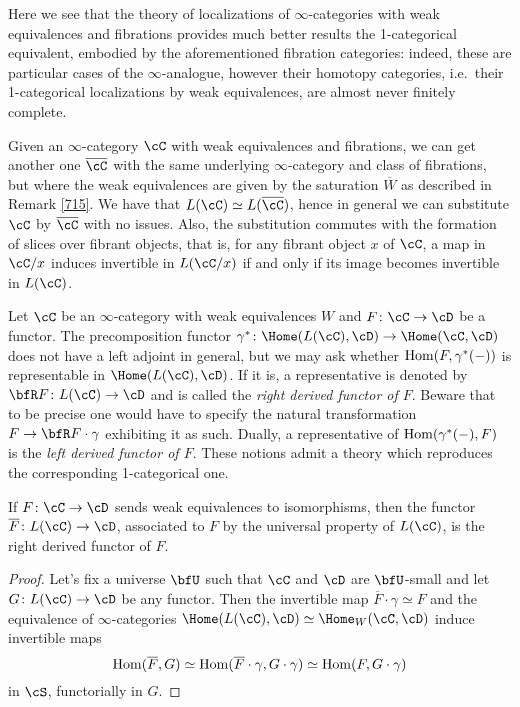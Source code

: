 \begin{rmk}
  Here we see that the theory of localizations of $\infty$-categories with weak
  equivalences and fibrations provides much better results the 1-categorical
  equivalent, embodied by the aforementioned fibration categories: indeed, these
  are particular cases of the $\infty$-analogue, however their homotopy
  categories, i.e.\ their 1-categorical localizations by weak equivalences, are
  almost never finitely complete.
\end{rmk}

\begin{construction}\label{7522}

  Given an $\infty$-category $\cC$ with weak equivalences and fibrations, we can
  get another one $\overline{\cC}$ with the same underlying $\infty$-category
  and class of fibrations, but where the weak equivalences are given by the
  saturation $\overline{W}$ as described in Remark \ref{715}. We have that
  $L(\cC)\simeq L(\overline{\cC})$, hence in general we can substitute $\cC$ by
  $\overline{\cC}$ with no issues. Also, the substitution commutes with the
  formation of slices over fibrant objects, that is, for any fibrant object $x$
  of $\cC$, a map in $\cC/x$ induces invertible in $L(\cC/x)$ if and only
  if its image becomes invertible in $L(\cC)$.
\end{construction}

\begin{rmk}
  Let $\cC$ be an $\infty$-category with weak equivalences $W$ and
  $F\colon\cC\rightarrow\cD$ be a functor. The precomposition functor
  $\gamma^*\colon\Home(L(\cC),\cD)\rightarrow\Home(\cC,\cD)$ does not have a
  left adjoint in general, but we may ask whether $\operatorname{Hom}(F,\gamma^*(-))$ is
  representable in $\Home(L(\cC),\cD)$. If it is, a representative is denoted by
  $\bfR F\colon L(\cC)\rightarrow\cD$ and is called the \emph{right derived
  functor of $F$}. Beware that to be precise one would have to specify the
  natural transformation $F\rightarrow\bfR F\cdot\gamma$ exhibiting it as such.
  Dually, a representative of $\operatorname{Hom}(\gamma^*(-),F)$ is the \emph{left derived
  functor of $F$}. These notions admit a theory which reproduces the
  corresponding 1-categorical one.
\end{rmk}

\begin{prop}\label{7524}

  If $F\colon\cC\rightarrow\cD$ sends weak equivalences to isomorphisms, then
  the functor $\overline{F}\colon L(\cC)\rightarrow\cD$, associated to $F$ by
  the universal property of $L(\cC)$, is the right derived functor of $F$.
\end{prop}
\begin{proof}
  Let's fix a universe $\bfU$ such that $\cC$ and $\cD$ are $\bfU$-small and let
  $G\colon L(\cC)\rightarrow\cD$ be any functor. Then the invertible map
  $\overline{F}\cdot\gamma\simeq F$ and the equivalence of $\infty$-categories
  $\Home(L(\cC),\cD)\simeq\Home_W(\cC,\cD)$ induce invertible maps
  \[\operatorname{Hom}(\overline{F},G)\simeq\operatorname{Hom}(\overline{F}\cdot\gamma,G\cdot\gamma)\simeq\operatorname{Hom}(F,G\cdot\gamma)\]
  in $\cS$, functorially in $G$.
\end{proof}


